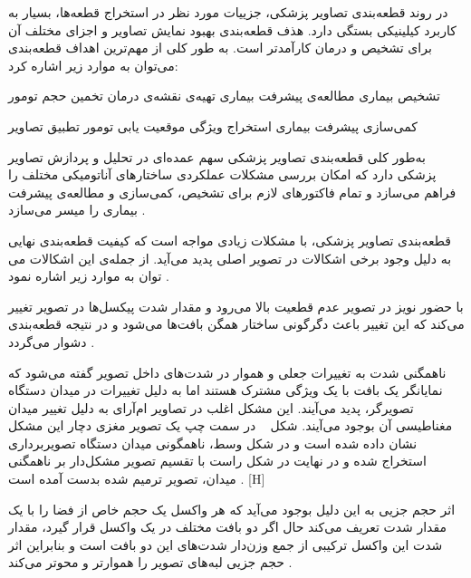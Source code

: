 در روند قطعه‌بندی تصاویر پزشکی، جزییات مورد نظر در استخراج قطعه‌ها، بسیار به کاربرد کیلینیکی بستگی دارد. هذف قطعه‌بندی بهبود نمایش تصاویر و اجزای مختلف آن برای تشخیص و درمان کارآمدتر است. به طور کلی از مهم‌ترین اهداف قطعه‌بندی می‌توان به موارد زیر اشاره کرد:
\begin{multicols}{2}
	 تشخیص بیماری
	 مطالعه‌ی پیشرفت بیماری
     تهیه‌ی نقشه‌ی درمان
     تخمین حجم تومور
	
	 کمی‌سازی پیشرفت بیماری
	 استخراج ویژگی
	 موقعیت یابی تومور
	 تطبیق تصاویر
	
\end{multicols}

به‌طور کلی قطعه‌بندی تصاویر پزشکی سهم عمده‌ای در تحلیل و پردازش تصاویر پزشکی دارد که امکان بررسی مشکلات عملکردی ساختارهای آناتومیکی مختلف را فراهم می‌سازد و تمام فاکتورهای لازم برای تشخیص، کمی‌سازی و مطالعه‌ی پیشرفت بیماری را میسر می‌سازد .

قطعه‌بندی تصاویر پزشکی، با مشکلات زیادی مواجه است که کیفیت قطعه‌بندی نهایی به دلیل وجود برخی اشکالات در تصویر اصلی پدید می‌آید. از جمله‌ی این اشکالات می توان به موارد زیر اشاره نمود .

با حضور نویز در تصویر عدم قطعیت بالا می‌رود و مقدار شدت پیکسل‌ها در تصویر تغییر می‌کند که این تغییر باعث دگرگونی ساختار همگن بافت‌ها می‌شود و در نتیجه قطعه‌بندی دشوار می‌گردد  
.

ناهمگنی شدت به تغییرات جعلی و هموار در شدت‌های داخل تصویر گفته می‌شود که نمایانگر یک بافت با یک ویژگی مشترک هستند اما به دلیل تغییرات در میدان دستگاه تصویرگر، پدید می‌آیند. این مشکل اغلب در تصاویر ام‌آرای به دلیل تغییر میدان مغناطیسی آن بوجود می‌آیند. شکل ~ در سمت چپ یک تصویر مغزی دچار این مشکل نشان داده شده است و در شکل وسط، ناهمگونی میدان دستگاه تصویربرداری استخراج شده و در نهایت در شکل راست با تقسیم تصویر مشکل‌دار بر ناهمگنی میدان، تصویر ترمیم شده بدست آمده است .
[H]

اثر حجم جزیی به این دلیل بوجود می‌آید که هر واکسل یک حجم خاص از فضا را با یک مقدار شدت تعریف می‌کند حال اگر دو بافت مختلف در یک واکسل قرار گیرد، مقدار شدت این واکسل ترکیبی از جمع وزن‌دار شدت‌های این دو بافت است و بنابراین اثر حجم جزیی لبه‌های تصویر را هموارتر و محوتر می‌کند .


